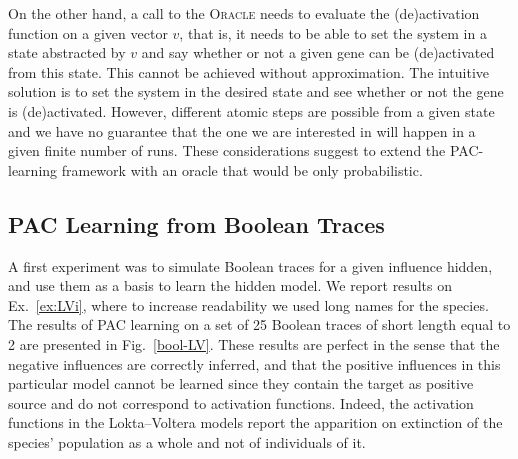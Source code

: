 \documentclass{llncs}
\begin{document}
On the other hand, a call to the \textsc{Oracle}  needs to evaluate the (de)activation function on a given vector $v$, that is, it needs to be able to set the system in a state abstracted by $v$ and say whether or not a given gene can be (de)activated from this state.
This cannot be achieved without approximation.
The intuitive solution is to set the system in the desired state and see whether or not the gene is (de)activated. 
However, different atomic steps are possible from a given state and we have no guarantee that the one we are interested in will happen in a given finite number of runs.
These considerations suggest to extend the PAC-learning framework with an oracle that would be only probabilistic.



\subsection{PAC Learning from Boolean Traces}

A first experiment was to simulate Boolean traces for a given influence hidden, and use them as a basis to learn the hidden model.
We report results on
Ex.~\ref{ex:LVi}, where to increase readability we used long names for the
species.
The results of PAC learning on a set of 25 Boolean traces of short length equal to 2
are presented in Fig.~\ref{bool-LV}. These results are perfect in the sense that the negative influences are correctly inferred,
and that the positive influences in this particular model cannot be learned since they contain the target as positive source and do not correspond to activation functions.
Indeed, the activation functions in the Lokta--Voltera models report the apparition on extinction of the species' population as a whole and not of individuals of it.
\end{document}
